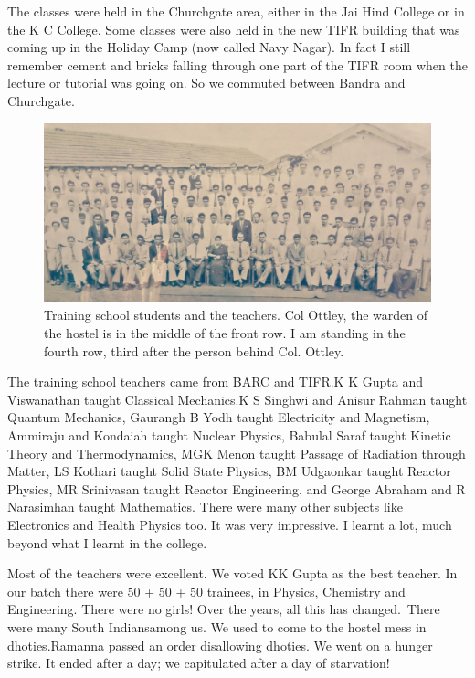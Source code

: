 The classes were held in the Churchgate area, either in the Jai Hind College or in the K C College. Some classes were also held in the new TIFR building that was coming up in the Holiday Camp (now called Navy Nagar). In fact I still remember cement and bricks falling through one part of the TIFR room when the lecture or tutorial was going on. So we commuted between Bandra and Churchgate.
\smallskip

\begin{figure}[H]
\centering
\includegraphics[width=1\textwidth]{images/new-images/06-Rajaji-TS.jpg}
\caption{\small{Training school students and the teachers. Col Ottley, the warden of the hostel is in the middle of the front row. I am standing in the fourth row, third after the person behind Col. Ottley.}}
\end{figure}

The training school teachers came from BARC and TIFR.\break K K Gupta and 
Viswanathan taught Classical Mechanics.\break K S Singhwi and Anisur Rahman 
taught Quantum Mechanics, Gaurangh B Yodh taught Electricity and 
Magnetism, Ammiraju and Kondaiah taught Nuclear Physics, Babulal Saraf 
taught Kine\-tic Theory and Thermodynamics, MGK Menon taught Passage of 
Radiation through Matter, LS Kothari taught Solid State Physics, BM 
Udgaonkar taught Reactor Physics, MR Srinivasan taught Reactor 
Engineering. and George Abraham and R Narasimhan taught Mathematics. 
There were many other subjects like Electro\-nics and Health Physics too. 
It was very impressive. I learnt a lot, much beyond what I learnt in the 
college.

Most of the teachers were excellent. We voted KK Gupta as the best teacher.
In our batch there were 50 + 50 + 50 trainees, in Physics, Chemistry
and Engineering. There were no girls! Over the years, all this has changed.\
There were many South Indians\break among us. We used to come to the hostel 
mess in dhoties.\break Ramanna passed an order disallowing dhoties. We went on 
a hunger strike. It ended after a day; we capitulated after a day of 
starvation!

